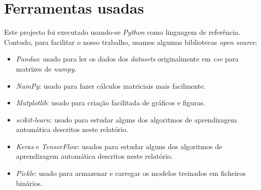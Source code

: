 \section{Ferramentas usadas}
Este projecto foi executado usando-se \textit{Python} como linguagem de referência. Contudo, para facilitar o nosso trabalho, usamos algumas bibliotecas \textit{open source}:
\begin{itemize}
\item \textit{Pandas}: usado para ler os dados dos \textit{datasets} originalmente em \textit{csv} para matrizes de \textit{numpy}.
\item \textit{NumPy}: usado para fazer cálculos matriciais mais facilmente.
\item \textit{Matplotlib}: usado para criação facilitada de gráficos e figuras.
\item \textit{scikit-learn}: usado para estudar alguns dos algoritmos de aprendizagem automática descritos neste relatório.
\item \textit{Keras} e \textit{TensorFlow}: usados para estudar alguns dos algoritmos de aprendizagem automática descritos neste relatório.
\item \textit{Pickle}: usado para armazenar e carregar os modelos treinados em ficheiros binários.
\end{itemize}

